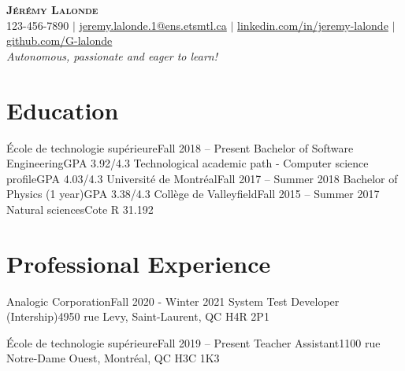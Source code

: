 \documentclass[letterpaper,11pt]{article}
\begin{document}
\begin{center}
  \textbf{\Huge \scshape Jérémy Lalonde} \\ \vspace{1pt}
  \small 123-456-7890 $|$ \href{mailto:jeremy.lalonde.1@ens.etsmtl.ca}{jeremy.lalonde.1@ens.etsmtl.ca} $|$ 
  \href{https://linkedin.com/in/jeremy-lalonde}{linkedin.com/in/jeremy-lalonde} $|$
  \href{https://github.com/G-lalonde}{github.com/G-lalonde} \\
  \textit{\small {Autonomous, passionate and eager to learn!}}
\end{center}

\section{Education}
  \resumeSubHeadingListStart
    \resumeSubheadingTwo 
      {École de technologie supérieure}{Fall 2018 -- Present}
      {Bachelor of Software Engineering}{GPA 3.92/4.3}
      {Technological academic path - Computer science profile}{GPA 4.03/4.3}
    \resumeSubheading
      {Université de Montréal}{Fall 2017 -- Summer 2018}
      {Bachelor of Physics (1 year)}{GPA 3.38/4.3}
    \resumeSubheading
      {Collège de Valleyfield}{Fall 2015 -- Summer 2017}
      {Natural sciences}{Cote R 31.192}
  \resumeSubHeadingListEnd

\section{Professional Experience}
  \resumeSubHeadingListStart

    \resumeSubheading
      {Analogic Corporation}{Fall 2020 - Winter 2021}
      {System Test Developer (Intership)}{4950 rue Levy, Saint-Laurent, QC H4R 2P1}
      \resumeItemListStart
      \resumeItemListEnd
      
    \resumeSubheading
      {École de technologie supérieure}{Fall 2019 -- Present}
      {Teacher Assistant}{1100 rue Notre-Dame Ouest, Montréal, QC H3C 1K3}
      \resumeItemListStart
      \resumeItemListEnd
    
\end{document}
